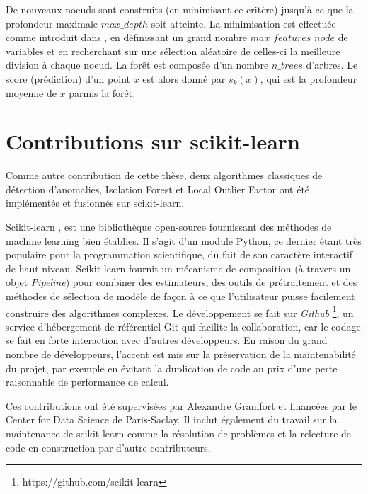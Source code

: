 \documentclass[a4paper, 12pt]{article}
\begin{document}
De nouveaux noeuds sont construits (en minimisant ce critère) jusqu'à ce que la profondeur maximale $ max\_depth $ soit atteinte.
La minimisation est effectuée comme introduit dans \citep{Amit1997}, en définissant un grand nombre $max\_features\_node $ de variables et en recherchant sur une sélection aléatoire de celles-ci la meilleure division à chaque noeud. La forêt est composée d'un nombre $n\_trees$ d'arbres. Le score (prédiction) d'un point $x$ est alors donné par $s_k(x)$, 
qui est la profondeur moyenne de $x$ parmis la forêt. 


\section{Contributions sur scikit-learn}
\label{resume_fr:sec:impl}

Comme autre contribution de cette thèse, deux algorithmes classiques de détection d'anomalies, Isolation Forest et Local Outlier Factor ont été implémentés et fusionnés sur scikit-learn. 

Scikit-learn \citep{sklearn2011}, est une bibliothèque open-source fournissant des méthodes de machine learning bien établies. Il s'agit d'un module Python, ce dernier étant très populaire pour la programmation scientifique, du fait de son caractère interactif de haut niveau. Scikit-learn fournit un mécanisme de composition (à travers un objet \emph{Pipeline}) pour combiner des estimateurs, des outils de prétraitement et des méthodes de sélection de modèle de façon à ce que l'utilisateur puisse facilement construire des algorithmes complexes. Le développement se fait sur \emph{Github} \footnote{https://github.com/scikit-learn}, un service d'hébergement de référentiel Git qui facilite la collaboration, car le codage se fait en forte interaction avec d'autres développeurs. En raison du grand nombre de développeurs, l'accent est mis sur la préservation de la maintenabilité du projet, par exemple en évitant la duplication de code au prix d'une perte raisonnable de performance de calcul.

Ces contributions ont été supervisées par Alexandre Gramfort et financées par le Center for Data Science de Paris-Saclay. Il inclut également du travail sur la maintenance de scikit-learn comme la résolution de problèmes et la relecture de code en construction par d'autre contributeurs. %
\end{document}
